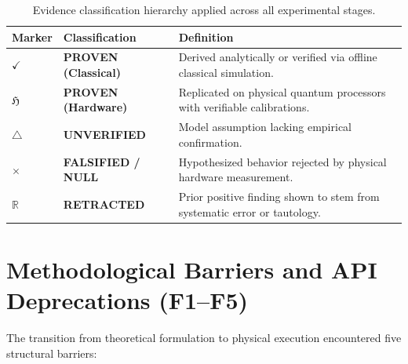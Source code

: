 \documentclass[11pt,a4paper]{article}
\begin{document}
\begin{table}[htbp]
\centering
\begin{tabular}{lll}
\toprule
\textbf{Marker} & \textbf{Classification} & \textbf{Definition} \\
\midrule
$\checkmark$ & \textbf{PROVEN (Classical)} & Derived analytically or verified via offline classical simulation. \\
$\mathfrak{H}$ & \textbf{PROVEN (Hardware)} & Replicated on physical quantum processors with verifiable calibrations. \\
$\triangle$ & \textbf{UNVERIFIED} & Model assumption lacking empirical confirmation. \\
$\times$ & \textbf{FALSIFIED / NULL} & Hypothesized behavior rejected by physical hardware measurement. \\
$\mathbb{R}$ & \textbf{RETRACTED} & Prior positive finding shown to stem from systematic error or tautology. \\
\bottomrule
\end{tabular}
\caption{Evidence classification hierarchy applied across all experimental stages.}
\label{tab:evidence_grades}
\end{table}

\section{Methodological Barriers and API Deprecations (F1--F5)}

The transition from theoretical formulation to physical execution encountered five structural barriers:
\end{document}
